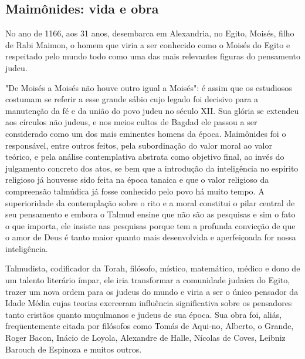 \begin{itemize}
\chapter{Maimônides: vida e obra}

No ano de 1166, aos 31 anos, desembarca em Alexandria, no Egito, Moisés,
filho de Rabi Maimon, o homem que viria a ser conhecido como o Moi­sés
do Egito e respeitado pelo mundo todo como uma das mais relevantes
figu­ras do pensamento judeu.

"De Moisés a Moisés não houve outro igual a Moisés": é assim que os
estudiosos costumam se referir a esse grande sábio cujo legado foi
decisivo para a manutenção da fé e da união do povo judeu no século XII.
Sua glória se extendeu aos círculos não judeus, e nos meios cultos de
Bagdad ele passou a ser considerado como um dos mais eminentes homens da
época. Maimôni­des foi o responsável, entre outros feitos, pela
subordinação do valor moral ao valor teórico, e pela análise
contemplativa abstrata como objetivo final, ao invés do julgamento
concreto dos atos, se bem que a introdução da inteligên­cia no espírito
religioso já houvesse sido feita na época tanaica e que o valor
religioso da compreensão talmúdica já fosse conhecido pelo povo há muito
tem­po. A superioridade da contemplação sobre o rito e a moral constitui
o pilar central de seu pensamento e embora o Talmud ensine que não são
as pesquisas e sim o fato o que importa, ele insiste nas pesquisas
porque tem a profunda convicção de que o amor de Deus é tanto maior
quanto mais desenvolvida e aperfeiçoada for nossa inteligência.

Talmudista, codificador da Torah, filósofo, místico, matemático, mé­dico
e dono de um talento literário ímpar, ele iria transformar a comunidade
judaica do Egito, trazer um nova ordem para os judeus do mundo e viria a
ser o único pensador da Idade Média cujas teorias exerceram influência
significati­va sobre os pensadores tanto cristãos quanto muçulmanos e
judeus de sua épo­ca. Sua obra foi, aliás, freqüentemente citada por
filósofos como Tomás de Aqui-no, Alberto, o Grande, Roger Bacon, Inácio
de Loyola, Alexandre de Halle, Ní­colas de Coves, Leibniz Barouch de
Espinoza e muitos outros.


\end{itemize}
